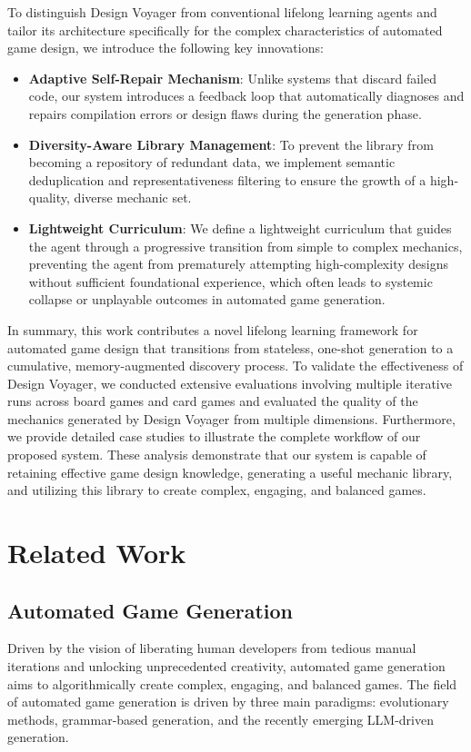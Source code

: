 \documentclass[conference]{IEEEtran}
\begin{document}
To distinguish Design Voyager from conventional lifelong learning agents and tailor its architecture specifically for the complex characteristics of automated game design, we introduce the following key innovations:
\begin{itemize}
    \item \textbf{Adaptive Self-Repair Mechanism}: Unlike systems that discard failed code, our system introduces a feedback loop that automatically diagnoses and repairs compilation errors or design flaws during the generation phase.
    \item \textbf{Diversity-Aware Library Management}: To prevent the library from becoming a repository of redundant data, we implement semantic deduplication and representativeness filtering to ensure the growth of a high-quality, diverse mechanic set.
    \item \textbf{Lightweight Curriculum}: We define a lightweight curriculum that guides the agent through a progressive transition from simple to complex mechanics, preventing the agent from prematurely attempting high-complexity designs without sufficient foundational experience, which often leads to systemic collapse or unplayable outcomes in automated game generation.
\end{itemize}

In summary, this work contributes a novel lifelong learning framework for automated game design that transitions from stateless, one-shot generation to a cumulative, memory-augmented discovery process. To validate the effectiveness of Design Voyager, we conducted extensive evaluations involving multiple iterative runs across board games and card games and evaluated the quality of the mechanics generated by Design Voyager from multiple dimensions. Furthermore, we provide detailed case studies to illustrate the complete workflow of our proposed system. These analysis demonstrate that our system is capable of retaining effective game design knowledge, generating a useful mechanic library, and utilizing this library to create complex, engaging, and balanced games.

\section{Related Work}
\subsection{Automated Game Generation}
Driven by the vision of liberating human developers from tedious manual iterations and unlocking unprecedented creativity, automated game generation aims to algorithmically create complex, engaging, and balanced games. The field of automated game generation is driven by three main paradigms: evolutionary methods, grammar-based generation, and the recently emerging LLM-driven generation.
\end{document}
